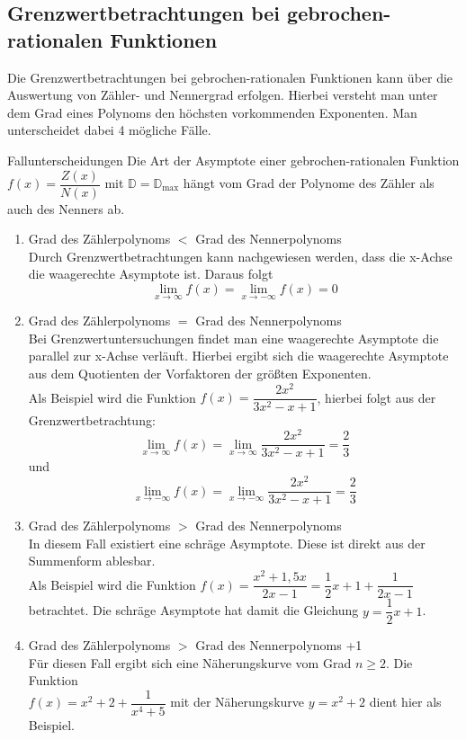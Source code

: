 \subsection{Grenzwertbetrachtungen bei gebrochen-rationalen Funktionen}  \label{Fallgebrochenrational}
Die Grenzwertbetrachtungen bei gebrochen-rationalen Funktionen kann über die Auswertung von Zähler- und Nennergrad erfolgen. Hierbei versteht man unter dem Grad eines Polynoms den höchsten vorkommenden Exponenten. Man unterscheidet dabei 4 mögliche Fälle.
\begin{merke}{Fallunterscheidungen}{}
Die Art der Asymptote einer gebrochen-rationalen Funktion $f(x)=\dfrac{Z(x)}{N(x)}$ mit $\mathds{D} = \mathds{D}_{\text{max}}$ hängt vom Grad der Polynome des Zähler als auch des Nenners ab.
\begin{enumerate}
    \item Grad des Zählerpolynoms $<$ Grad des Nennerpolynoms\\
    Durch Grenzwertbetrachtungen kann nachgewiesen werden, dass die x-Achse die waagerechte Asymptote ist. Daraus folgt $$\lim_{x\longrightarrow \infty} f(x) = \lim_{x\longrightarrow -\infty} f(x) = 0$$
\item  Grad des Zählerpolynoms $=$ Grad des Nennerpolynoms\\ Bei Grenzwertuntersuchungen findet man eine waagerechte Asymptote die parallel zur x-Achse verläuft. Hierbei ergibt sich die waagerechte Asymptote aus dem Quotienten der Vorfaktoren der größten Exponenten.\\ Als Beispiel wird die Funktion $f(x)= \dfrac{2x^2}{3x^2-x+1}$, hierbei folgt aus der Grenzwertbetrachtung: $$\lim_{x\longrightarrow \infty} f(x) = \lim_{x\longrightarrow \infty} \dfrac{2x^2}{3x^2-x+1} = \dfrac{2}{3}$$ und $$\lim_{x\longrightarrow -\infty} f(x) = \lim_{x\longrightarrow -\infty} \dfrac{2x^2}{3x^2-x+1} = \dfrac{2}{3}$$
\item Grad des Zählerpolynoms $>$ Grad des Nennerpolynoms\\
In diesem Fall existiert eine schräge Asymptote. Diese ist direkt aus der Summenform ablesbar. \\ Als Beispiel wird die Funktion $f(x)= \dfrac{x^2+1,5x}{2x-1} = \dfrac{1}{2}x+1+\dfrac{1}{2x-1}$ betrachtet. Die schräge Asymptote hat damit die Gleichung $y= \dfrac{1}{2}x+1$.
\item Grad des Zählerpolynoms $>$ Grad des Nennerpolynoms +1\\
Für diesen Fall ergibt sich eine Näherungskurve vom Grad $n\geq 2$. Die Funktion\\ $f(x) = x^2+2+\dfrac{1}{x^4+5}$ mit der Näherungskurve $y= x^2+2$ dient hier als Beispiel.
\end{enumerate}
\end{merke}
